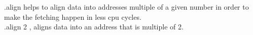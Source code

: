 \documentclass{article}
\begin{document}
\noindent.align helps to align data into addresses multiple of a given number
in order to make the fetching happen in less cpu cycles.\\
.align 2 , aligns data into an address that is multiple of 2.
\end{document}
